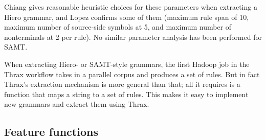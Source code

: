 \documentclass[11pt]{article}
\begin{document}
Chiang  gives reasonable heuristic choices for these parameters when extracting a Hiero grammar, and Lopez  confirms some of them (maximum rule span of 10, maximum number of source-side symbols at 5, and maximum number of nonterminals at 2 per rule). No similar parameter analysis has been performed for SAMT.

When extracting Hiero- or SAMT-style grammars, the first Hadoop job in the Thrax workflow takes in a parallel corpus and produces a set of rules. But in fact Thrax's extraction mechanism is more general than that; all it requires is a function that maps a string to a set of rules. This makes it easy to implement new grammars and extract them using Thrax.

\subsection{Feature functions}
\label{features}
\end{document}
